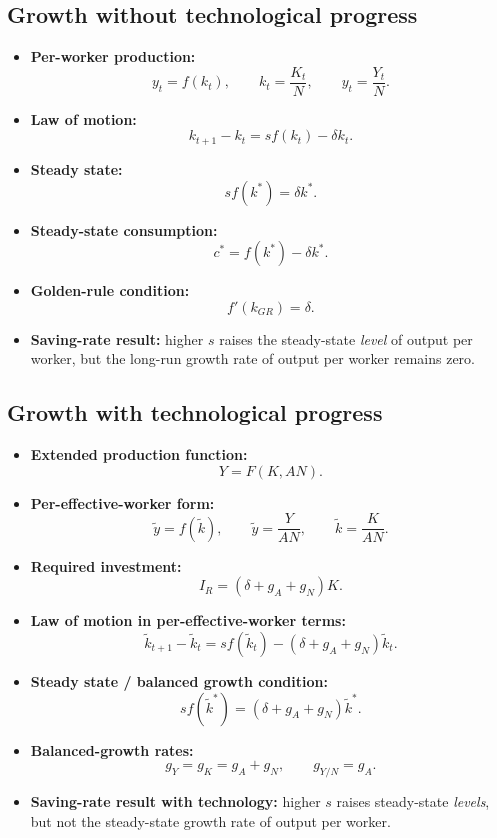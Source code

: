 \documentclass[12pt]{article}
\begin{document}
\subsection*{Growth without technological progress}

\begin{itemize}[leftmargin=1.5em]
\item \textbf{Per-worker production:}
\[
y_t=f(k_t),
\qquad
k_t=\frac{K_t}{N},
\qquad
y_t=\frac{Y_t}{N}.
\]
\item \textbf{Law of motion:}
\[
k_{t+1}-k_t=s f(k_t)-\delta k_t.
\]
\item \textbf{Steady state:}
\[
s f(k^*)=\delta k^*.
\]
\item \textbf{Steady-state consumption:}
\[
c^*=f(k^*)-\delta k^*.
\]
\item \textbf{Golden-rule condition:}
\[
f'(k_{GR})=\delta.
\]
\item \textbf{Saving-rate result:} higher \(s\) raises the steady-state \emph{level} of output per worker, but the long-run growth rate of output per worker remains zero.
\end{itemize}

\subsection*{Growth with technological progress}

\begin{itemize}[leftmargin=1.5em]
\item \textbf{Extended production function:}
\[
Y=F(K,AN).
\]
\item \textbf{Per-effective-worker form:}
\[
\tilde{y}=f(\tilde{k}),
\qquad
\tilde{y}=\frac{Y}{AN},
\qquad
\tilde{k}=\frac{K}{AN}.
\]
\item \textbf{Required investment:}
\[
I_R=(\delta+g_A+g_N)K.
\]
\item \textbf{Law of motion in per-effective-worker terms:}
\[
\tilde{k}_{t+1}-\tilde{k}_t=s f(\tilde{k}_t)-(\delta+g_A+g_N)\tilde{k}_t.
\]
\item \textbf{Steady state / balanced growth condition:}
\[
s f(\tilde{k}^*)=(\delta+g_A+g_N)\tilde{k}^*.
\]
\item \textbf{Balanced-growth rates:}
\[
g_Y=g_K=g_A+g_N,
\qquad
g_{Y/N}=g_A.
\]
\item \textbf{Saving-rate result with technology:} higher \(s\) raises steady-state \emph{levels}, but not the steady-state growth rate of output per worker.
\end{itemize}
\end{document}
